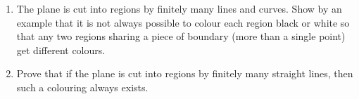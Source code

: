 \begin{enumerate}
\item[(a)] The plane is cut into regions by finitely many lines and curves. Show by an example that it is not always possible to colour each region black or white so that any two regions sharing a piece of boundary (more than a single point) get different colours.
\item[(b)] Prove that if the plane is cut into regions by finitely many straight lines, then such a colouring always exists.
\end{enumerate}

